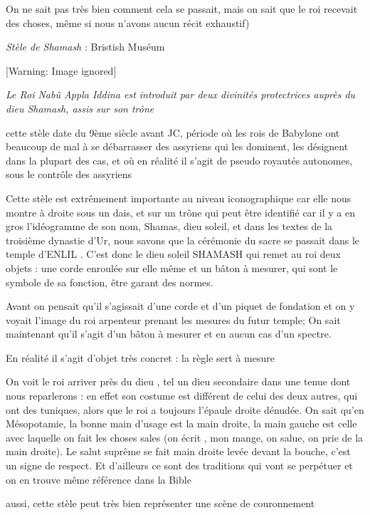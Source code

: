 \documentclass[a4paper,10pt]{article}
\begin{document}
On ne sait pas très bien comment cela se passait, mais on sait que le
roi recevait des choses, même si nous n'avons aucun
récit exhaustif)

\textit{Stèle de Shamash} : Bristish Muséum

  [Warning: Image ignored] %
 

\textit{Le Roi Nabû Appla Iddina est introduit par deux divinités
protectrices auprès du dieu Shamash, assis sur son trône}

cette stèle date du 9ème siècle avant JC, période où les rois de
Babylone ont beaucoup de mal à se débarrasser des assyriens qui les
dominent, les désignent dans la plupart des cas, et où en réalité il
s'agit de pseudo royautés autonomes, sous le contrôle
des assyriens

Cette stèle est extrêmement importante au niveau iconographique car elle
nous montre à droite sous un dais, et sur un trône qui peut être
identifié car il y a en gros l'idéogramme de son nom,
Shamas, dieu soleil, et dans les textes de la troisième dynastie
d'Ur, nous savons que la cérémonie du sacre se passait
dans le temple d'ENLIL . C'est donc
le dieu soleil SHAMASH qui remet au roi deux objets : une corde
enroulée sur elle même et un bâton à mesurer, qui sont le symbole de sa
fonction, être garant des normes.

Avant on pensait qu'il s'agissait
d'une corde et d'un piquet de
fondation et on y voyait l'image du roi arpenteur
prenant les mesures du futur temple; On sait maintenant
qu'il s'agit d'un
bâton à mesurer et en aucun cas  d'un spectre.

En réalité il s'agit d'objet très
concret : la règle sert à mesure

On voit le roi arriver près du dieu , tel un dieu secondaire dans une
tenue dont nous reparlerons  : en effet son costume est différent de
celui des deux autres, qui ont des tuniques, alors que le roi  a
toujours l'épaule droite dénudée. On sait
qu'en Mésopotamie, la bonne main
d'usage est la main droite, la main gauche est celle
avec laquelle on fait les choses sales (on écrit , mon mange, on salue,
on prie de la  main droite). Le salut suprême se fait main droite levée
devant la bouche, c'est un signe de respect. Et
d'ailleurs ce sont des traditions qui vont se
perpétuer et on en trouve même référence dans la Bible

aussi, cette stèle peut très bien représenter une scène de couronnement
\end{document}
